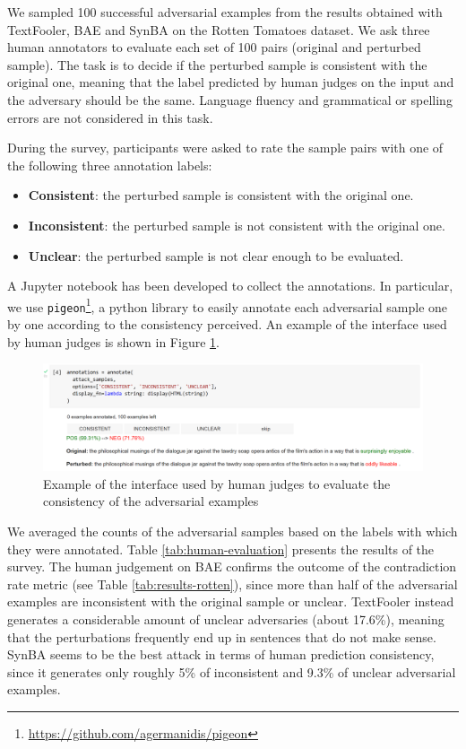 We sampled 100 successful adversarial examples from the results obtained with TextFooler, BAE and SynBA on the Rotten Tomatoes dataset.
We ask three human annotators to evaluate each set of 100 pairs (original and perturbed sample).
The task is to decide if the perturbed sample is consistent with the original one, meaning that the label predicted by human judges on the input and the adversary should be the same.
Language fluency and grammatical or spelling errors are not considered in this task.

During the survey, participants were asked to rate the sample pairs with one of the following three annotation labels: 
\begin{itemize}
    \item \textbf{Consistent}: the perturbed sample is consistent with the original one.
    \item \textbf{Inconsistent}: the perturbed sample is not consistent with the original one.
    \item \textbf{Unclear}: the perturbed sample is not clear enough to be evaluated.
\end{itemize}


A Jupyter notebook has been developed to collect the annotations. In particular, we use \texttt{pigeon}\footnote{\url{https://github.com/agermanidis/pigeon}}, a python library to easily annotate each adversarial sample one by one according to the consistency perceived.
An example of the interface used by human judges is shown in Figure \ref{fig:human-evaluation-form}.

\begin{figure}
    \centering
    \includegraphics[width=0.99\linewidth]{images/human-evaluation-form.png}
    \caption{Example of the interface used by human judges to evaluate the consistency of the adversarial examples}
    \label{fig:human-evaluation-form}
\end{figure}

We averaged the counts of the adversarial samples based on the labels with which they were annotated. Table \ref{tab:human-evaluation} presents the results of the survey.
The human judgement on BAE confirms the outcome of the contradiction rate metric (see Table \ref{tab:results-rotten}), since more than half of the adversarial examples are inconsistent with the original sample or unclear.
TextFooler instead generates a considerable amount of unclear adversaries (about 17.6\%), meaning that the perturbations frequently end up in sentences that do not make sense.
SynBA seems to be the best attack in terms of human prediction consistency, since it generates only roughly 5\% of inconsistent and 9.3\% of unclear adversarial examples.


